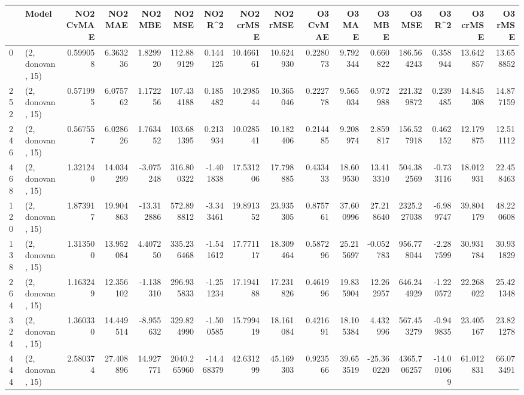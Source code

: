 \begin{tabular}{llrrrrrrrrrrrrrr}
\toprule
{} &             Model &  NO2 CvMAE &    NO2 MAE &    NO2 MBE &      NO2 MSE &    NO2 R\textasciicircum2 &  NO2 crMSE &   NO2 rMSE &  O3 CvMAE &     O3 MAE &     O3 MBE &       O3 MSE &     O3 R\textasciicircum2 &   O3 crMSE &    O3 rMSE \\
\midrule
0   &  (2, donovan, 15) &   0.599058 &   6.363236 &   1.829920 &   112.889129 &   0.144125 &  10.466161 &  10.624930 &  0.228073 &   9.792344 &   0.660822 &   186.564243 &   0.358944 &  13.642857 &  13.658852 \\
252 &  (2, donovan, 15) &   0.571995 &   6.075762 &   1.172256 &   107.434188 &   0.185482 &  10.298544 &  10.365046 &  0.222778 &   9.565034 &   0.972988 &   221.329872 &   0.239485 &  14.845308 &  14.877159 \\
246 &  (2, donovan, 15) &   0.567557 &   6.028626 &   1.763452 &   103.681395 &   0.213934 &  10.028541 &  10.182406 &  0.214485 &   9.208974 &   2.859817 &   156.527918 &   0.462152 &  12.179875 &  12.511112 \\
468 &  (2, donovan, 15) &   1.321240 &  14.034299 &  -3.075248 &   316.800322 &  -1.401838 &  17.531206 &  17.798885 &  0.433433 &  18.609530 &  13.413310 &   504.382569 &  -0.733116 &  18.012931 &  22.458463 \\
120 &  (2, donovan, 15) &   1.873917 &  19.904863 & -13.312886 &   572.898812 &  -3.343461 &  19.891352 &  23.935305 &  0.875761 &  37.600996 &  27.218640 &  2325.227038 &  -6.989747 &  39.804179 &  48.220608 \\
138 &  (2, donovan, 15) &   1.313500 &  13.952084 &   4.407250 &   335.236468 &  -1.541612 &  17.771117 &  18.309464 &  0.587296 &  25.215697 &  -0.052783 &   956.778044 &  -2.287599 &  30.931784 &  30.931829 \\
264 &  (2, donovan, 15) &   1.163249 &  12.356102 &  -1.138310 &   296.935833 &  -1.251234 &  17.194188 &  17.231826 &  0.461996 &  19.835904 &  12.262957 &   646.244929 &  -1.220572 &  22.268022 &  25.421348 \\
324 &  (2, donovan, 15) &   1.360330 &  14.449514 &  -8.955632 &   329.824990 &  -1.500585 &  15.799419 &  18.161084 &  0.421691 &  18.105384 &   4.432996 &   567.453279 &  -0.949835 &  23.405167 &  23.821278 \\
444 &  (2, donovan, 15) &   2.580374 &  27.408896 &  14.927771 &  2040.265960 & -14.468379 &  42.631299 &  45.169303 &  0.923566 &  39.653519 & -25.360220 &  4365.706257 & -14.001069 &  61.012831 &  66.073491 \\

\end{tabular}
